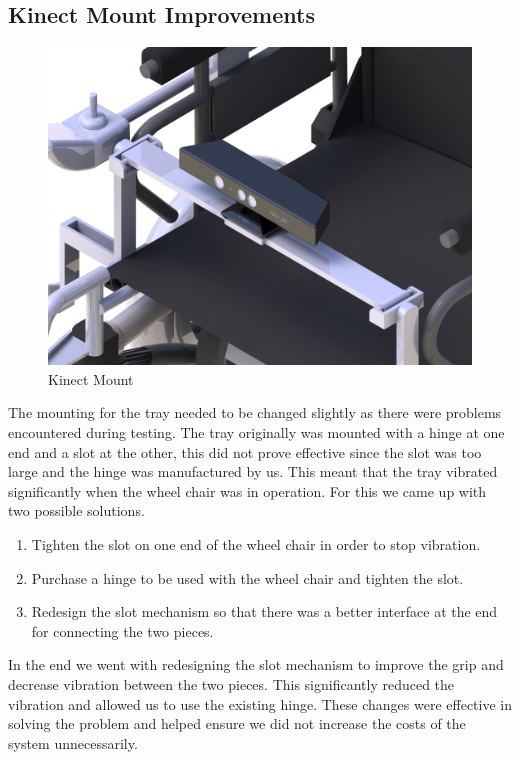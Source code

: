 \documentclass[oneside,final,a4paper]{report}
\begin{document}
\subsection{Kinect Mount Improvements}
\begin{figure}[hbt]
 \centering
 \includegraphics[scale=0.5]{KINECT_RENDER}
 \caption{Kinect Mount}
 \label{fig:kinect_mount}
\end{figure}
The mounting for the tray needed to be changed slightly as there were problems encountered during testing. The tray originally was mounted with a hinge at one end and a slot at the other, this did not prove effective since the slot was too large and the hinge was manufactured by us. This meant that the tray vibrated significantly when the wheel chair was in operation. For this we came up with two possible solutions.
\begin{enumerate}
\item Tighten the slot on one end of the wheel chair in order to stop vibration.
\item Purchase a hinge to be used with the wheel chair and tighten the slot.
\item Redesign the slot mechanism so that there was a better interface at the end for connecting the two pieces.
\end{enumerate}
In the end we went with redesigning the slot mechanism to improve the grip and decrease vibration between the two pieces. This significantly reduced the vibration and allowed us to use the existing hinge. These changes were effective in solving the problem and helped ensure we did not increase the costs of the system unnecessarily.
\end{document}
